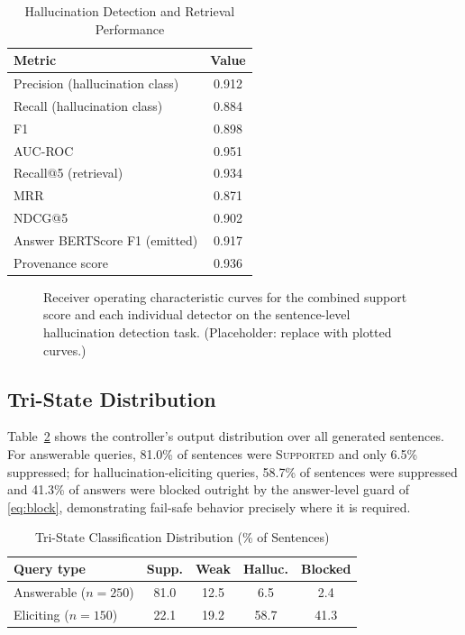 \documentclass[journal]{IEEEtran}
\begin{document}
\begin{table}[!t]
\caption{Hallucination Detection and Retrieval Performance}
\label{tab:main}
\centering
\small
\begin{tabular}{@{}lc@{}}
\toprule
Metric & Value \\
\midrule
Precision (hallucination class) & 0.912 \\
Recall (hallucination class) & 0.884 \\
F1 & 0.898 \\
AUC-ROC & 0.951 \\
Recall@5 (retrieval) & 0.934 \\
MRR & 0.871 \\
NDCG@5 & 0.902 \\
Answer BERTScore F1 (emitted) & 0.917 \\
Provenance score & 0.936 \\
\bottomrule
\end{tabular}
\end{table}

\begin{figure}[!t]
\centering
{}
\caption{Receiver operating characteristic curves for the combined support
score and each individual detector on the sentence-level hallucination
detection task. (Placeholder: replace with plotted curves.)}
\label{fig:roc}
\end{figure}

\subsection{Tri-State Distribution}
Table~\ref{tab:tristate} shows the controller's output distribution over all
generated sentences. For answerable queries, 81.0\% of sentences were
\textsc{Supported} and only 6.5\% suppressed; for hallucination-eliciting
queries, 58.7\% of sentences were suppressed and 41.3\% of answers were
blocked outright by the answer-level guard of \eqref{eq:block},
demonstrating fail-safe behavior precisely where it is required.

\begin{table}[!t]
\caption{Tri-State Classification Distribution (\% of Sentences)}
\label{tab:tristate}
\centering
\small
\begin{tabular}{@{}lcccc@{}}
\toprule
Query type & Supp. & Weak & Halluc. & Blocked \\
\midrule
Answerable ($n{=}250$) & 81.0 & 12.5 & 6.5 & 2.4 \\
Eliciting ($n{=}150$) & 22.1 & 19.2 & 58.7 & 41.3 \\
\bottomrule
\end{tabular}
\end{table}
\end{document}

